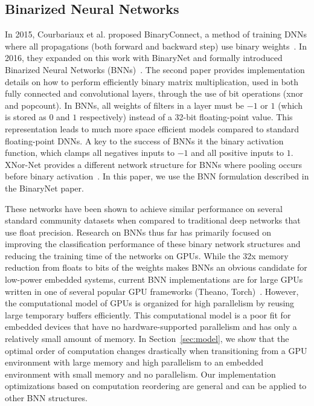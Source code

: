 \documentclass[10pt,emptycopyrightspace]{ewsn-proc}
\begin{document}
\subsection{Binarized Neural Networks}
In 2015, Courbariaux et al. proposed BinaryConnect, a method of training DNNs where all propagations (both forward and backward step) use binary weights~\cite{courbariaux2015binaryconnect}. In 2016, they expanded on this work with BinaryNet and formally introduced Binarized Neural Networks (BNNs)~\cite{courbariaux2016binarynet}. The second paper provides implementation details on how to perform efficiently binary matrix multiplication, used in both fully connected and convolutional layers, through the use of bit operations (xnor and popcount). In BNNs, all weights of filters in a layer must be $-1$ or $1$ (which is stored as $0$ and $1$ respectively) instead of a 32-bit floating-point value. This representation leads to much more space efficient models compared to standard floating-point DNNs. A key to the success of BNNs it the binary activation function, which clamps all negatives inputs to $-1$ and all positive inputs to $1$.  XNor-Net provides a different network structure for BNNs where pooling occurs before binary activation~\cite{rastegari2016xnor}. In this paper, we use the BNN formulation described in the BinaryNet paper. 

These networks have been shown to achieve similar performance on several standard community datasets when compared to traditional deep networks that use float precision. Research on BNNs thus far has primarily focused on improving the classification performance of these binary network structures and reducing the training time of the networks on GPUs. While the 32x memory reduction from floats to bits of the weights makes BNNs an obvious candidate for low-power embedded systems, current BNN implementations are for large GPUs written in one of several popular GPU frameworks (Theano, Torch)~\cite{team2016theano,collobert2002torch}. However, the computational model of GPUs is organized for high parallelism by reusing large temporary buffers efficiently. This computational model is a poor fit for embedded devices that have no hardware-supported parallelism and has only a relatively small amount of memory. In Section~\ref{sec:model}, we show that the optimal order of computation changes drastically when transitioning from a GPU environment with large memory and high parallelism to an embedded environment with small memory and no parallelism. Our implementation optimizations based on computation reordering are general and can be applied to other BNN structures.
\end{document}
